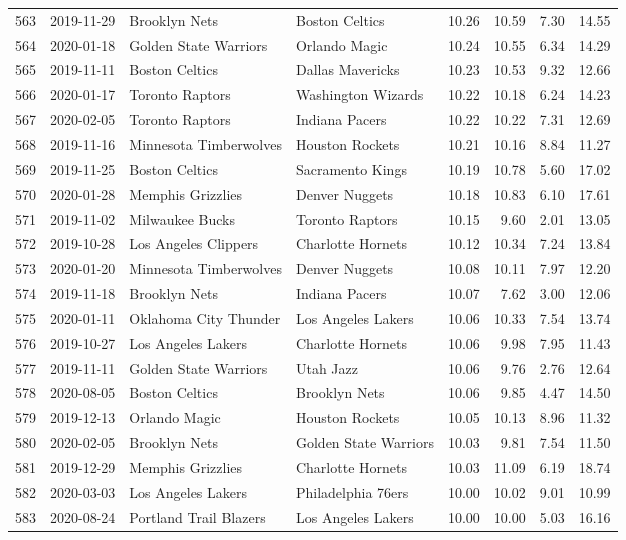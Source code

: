 \documentclass[
  11pt,
]{article}
\theoremstyle{nonumberplain}
\begin{document}
\begin{longtable}{rl|llr|rrr}
563 & 2019-11-29 & Brooklyn Nets & Boston Celtics & 10.26 & 10.59 & 7.30 & 14.55\\
564 & 2020-01-18 & Golden State Warriors & Orlando Magic & 10.24 & 10.55 & 6.34 & 14.29\\
565 & 2019-11-11 & Boston Celtics & Dallas Mavericks & 10.23 & 10.53 & 9.32 & 12.66\\
566 & 2020-01-17 & Toronto Raptors & Washington Wizards & 10.22 & 10.18 & 6.24 & 14.23\\
567 & 2020-02-05 & Toronto Raptors & Indiana Pacers & 10.22 & 10.22 & 7.31 & 12.69\\
568 & 2019-11-16 & Minnesota Timberwolves & Houston Rockets & 10.21 & 10.16 & 8.84 & 11.27\\
569 & 2019-11-25 & Boston Celtics & Sacramento Kings & 10.19 & 10.78 & 5.60 & 17.02\\
570 & 2020-01-28 & Memphis Grizzlies & Denver Nuggets & 10.18 & 10.83 & 6.10 & 17.61\\
571 & 2019-11-02 & Milwaukee Bucks & Toronto Raptors & 10.15 & 9.60 & 2.01 & 13.05\\
572 & 2019-10-28 & Los Angeles Clippers & Charlotte Hornets & 10.12 & 10.34 & 7.24 & 13.84\\
573 & 2020-01-20 & Minnesota Timberwolves & Denver Nuggets & 10.08 & 10.11 & 7.97 & 12.20\\
574 & 2019-11-18 & Brooklyn Nets & Indiana Pacers & 10.07 & 7.62 & 3.00 & 12.06\\
575 & 2020-01-11 & Oklahoma City Thunder & Los Angeles Lakers & 10.06 & 10.33 & 7.54 & 13.74\\
576 & 2019-10-27 & Los Angeles Lakers & Charlotte Hornets & 10.06 & 9.98 & 7.95 & 11.43\\
577 & 2019-11-11 & Golden State Warriors & Utah Jazz & 10.06 & 9.76 & 2.76 & 12.64\\
578 & 2020-08-05 & Boston Celtics & Brooklyn Nets & 10.06 & 9.85 & 4.47 & 14.50\\
579 & 2019-12-13 & Orlando Magic & Houston Rockets & 10.05 & 10.13 & 8.96 & 11.32\\
580 & 2020-02-05 & Brooklyn Nets & Golden State Warriors & 10.03 & 9.81 & 7.54 & 11.50\\
581 & 2019-12-29 & Memphis Grizzlies & Charlotte Hornets & 10.03 & 11.09 & 6.19 & 18.74\\
582 & 2020-03-03 & Los Angeles Lakers & Philadelphia 76ers & 10.00 & 10.02 & 9.01 & 10.99\\
583 & 2020-08-24 & Portland Trail Blazers & Los Angeles Lakers & 10.00 & 10.00 & 5.03 & 16.16\\

\end{longtable}
\end{document}
